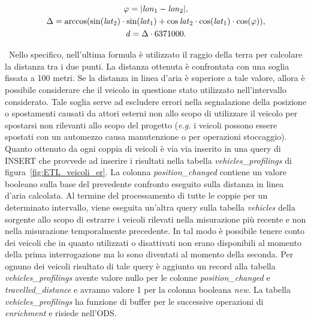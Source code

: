 \begin{gather}
\varphi = \lvert\mathit{lon}_1 - \mathit{lon}_2\rvert, \notag \\
\Delta = \arccos(\sin(\mathit{lat}_2) \cdot \sin(\mathit{lat}_1) + \cos{\mathit{lat}_2} \cdot \cos(\mathit{lat}_1) \cdot \cos(\varphi)), \notag \\
\mathit{d} = \Delta \cdot 6371000. \notag
\end{gather}

\noindent~Nello specifico, nell'ultima formula è utilizzato il raggio della
terra per calcolare la distanza tra i due punti. La distanza ottenuta è
confrontata con una soglia fissata a 100 metri. Se la distanza in linea d'aria
è superiore a tale valore, allora è possibile considerare che il veicolo in
questione stato utilizzato nell'intervallo considerato. Tale soglia serve
ad escludere errori nella segnalazione della posizione o spostamenti causati da
attori esterni non allo scopo di utilizzare il veicolo per spostarsi 
non rilevanti allo scopo del progetto (\textit{e.g.} i veicoli possono essere spostati con un automezzo causa manutenzione o per operazioni stoccaggio). 
Quanto ottenuto da ogni coppia di veicoli è via via inserito in una query di INSERT che provvede ad inserire i risultati
nella tabella \textit{vehicles\_profilings} di figura~\ref{fig:ETL_veicoli_er}.
La colonna \textit{position\_changed} contiene un valore booleano sulla base
del prevedente confronto eseguito sulla distanza in linea d'aria calcolata.
Al termine del processamento di tutte le coppie per un determinato intervallo,
viene eseguita un'altra query sulla tabella \textit{vehicles} della sorgente allo 
scopo di estrarre i veicoli rilevati nella misurazione più recente e non nella  
misurazione temporalmente precedente. In tal modo è possibile tenere conto dei
veicoli che in quanto utilizzati o disattivati non erano disponibili al momento 
della prima interrogazione ma lo sono diventati al momento della seconda. Per 
ognuno dei veicoli risultato di tale query è aggiunto un record alla tabella
\textit{vehicles\_profilings} avente valore nullo per le colonne 
\textit{position\_changed} e \textit{travelled\_distance} e avranno valore
1 per la colonna booleana \textit{new}. La tabella \textit{vehicles\_profilings}
ha funzione di buffer per le successive operazioni di \textit{enrichment} e risiede
nell'ODS.

